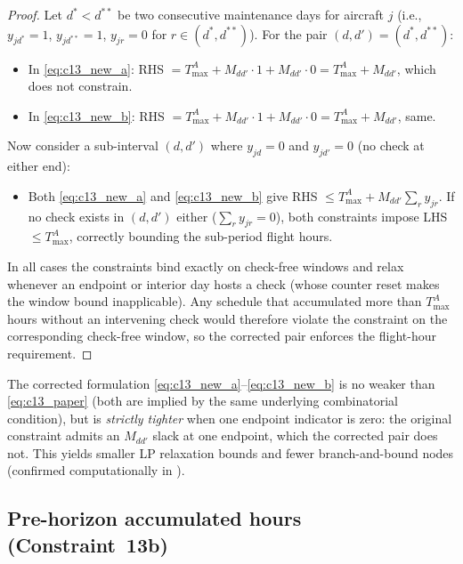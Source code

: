 \begin{proof}
  Let $d^* < d^{**}$ be two consecutive maintenance days for aircraft $j$
  (i.e., $y_{jd^*} = 1$, $y_{jd^{**}} = 1$, $y_{jr} = 0$ for $r \in
  (d^*, d^{**})$).  For the pair $(d, d') = (d^*, d^{**})$:
  \begin{itemize}
    \item In \eqref{eq:c13_new_a}: RHS $= T^A_{\max} + M_{dd'} \cdot 1 +
      M_{dd'} \cdot 0 = T^A_{\max} + M_{dd'}$, which does not constrain.
    \item In \eqref{eq:c13_new_b}: RHS $= T^A_{\max} + M_{dd'} \cdot 1 +
      M_{dd'} \cdot 0 = T^A_{\max} + M_{dd'}$, same.
  \end{itemize}
  Now consider a sub-interval $(d, d')$ where $y_{jd} = 0$ and $y_{jd'} = 0$
  (no check at either end):
  \begin{itemize}
    \item Both \eqref{eq:c13_new_a} and \eqref{eq:c13_new_b} give
      RHS $\le T^A_{\max} + M_{dd'}\sum_r y_{jr}$.  If no check exists in
      $(d, d')$ either ($\sum_r y_{jr} = 0$), both constraints impose LHS
      $\le T^A_{\max}$, correctly bounding the sub-period flight hours.
  \end{itemize}
  In all cases the constraints bind exactly on check-free windows and relax
  whenever an endpoint or interior day hosts a check (whose counter reset makes
  the window bound inapplicable).  Any schedule that accumulated more than
  $T^A_{\max}$ hours without an intervening check would therefore violate the
  constraint on the corresponding check-free window, so the corrected pair
  enforces the flight-hour requirement.
\end{proof}

\begin{remark}[Tightness]
  The corrected formulation \eqref{eq:c13_new_a}--\eqref{eq:c13_new_b} is no
  weaker than \eqref{eq:c13_paper} (both are implied by the same underlying
  combinatorial condition), but is \emph{strictly tighter} when one endpoint
  indicator is zero: the original constraint admits an $M_{dd'}$ slack at one
  endpoint, which the corrected pair does not.  This yields smaller LP
  relaxation bounds and fewer branch-and-bound nodes (confirmed
  computationally in ).
\end{remark}

\subsection{Pre-horizon accumulated hours (Constraint~13b)}
\label{subsec:c13b}

